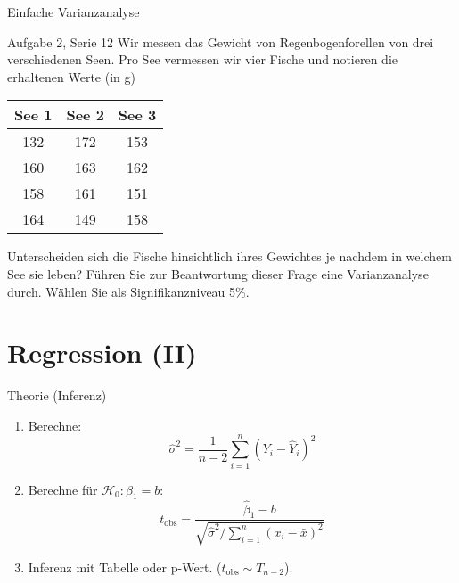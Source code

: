 \documentclass{beamer}
\begin{document}
\begin{frame}{Einfache Varianzanalyse}
\begin{beamerboxesrounded}[shadow]{Aufgabe 2, Serie 12}
Wir messen das Gewicht von Regenbogenforellen von drei verschiedenen Seen. Pro See
vermessen wir vier Fische und notieren die erhaltenen Werte (in g)

\vspace{2mm}\begin{center}{\scriptsize\begin{tabular}{ccc}\toprule
See 1 & See 2 & See 3\\\midrule
132 & 172 & 153\\
160 & 163 & 162\\
158 & 161 & 151\\
164 & 149 & 158\\
\bottomrule
\end{tabular}}\end{center}\vspace{2mm}

Unterscheiden sich die Fische hinsichtlich ihres Gewichtes je nachdem in welchem
See sie leben? Führen Sie zur Beantwortung dieser Frage eine Varianzanalyse durch.
Wählen Sie als Signifikanzniveau 5\%.
\end{beamerboxesrounded}
\end{frame}

\section{Regression (II)}

\begin{frame}{Theorie (Inferenz)}
\begin{enumerate}
\item Berechne:
$$
\hat{\sigma}^2 = \frac{1}{n-2}\sum_{i=1}^n (Y_i-\hat{Y}_i)^2
$$
\item Berechne für $\mathcal{H}_0: \beta_1=b$:
$$
t_\text{obs}=\frac{\hat\beta_1-b}{\sqrt{\hat\sigma^2/\sum_{i=1}^n(x_i-\bar{x})^2}}
$$
\item Inferenz mit Tabelle oder p-Wert. ($t_\text{obs}\sim T_{n-2}$).
\end{enumerate}
\end{frame}
\end{document}

